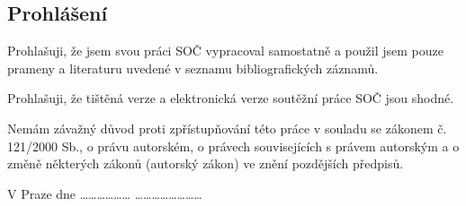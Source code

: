 \clearpageenabledfalse %
\newpage

\begin{Large}
\section*{Prohlášení}
\end{Large}



Prohlašuji, že jsem svou práci SOČ vypracoval samostatně a použil jsem pouze prameny a literaturu uvedené v seznamu bibliografických záznamů.

Prohlašuji, že tištěná verze a elektronická verze soutěžní práce SOČ jsou shodné. 

Nemám závažný důvod proti zpřístupňování této práce v souladu se zákonem č. 121/2000 Sb., o právu autorském, o právech souvisejících s právem autorským a o změně některých zákonů (autorský zákon) ve znění pozdějších předpisů. 

\vspace{40pt}

V Praze dne ……………… \hspace{20pt} …………………… \\


\clearpageenabledtrue %